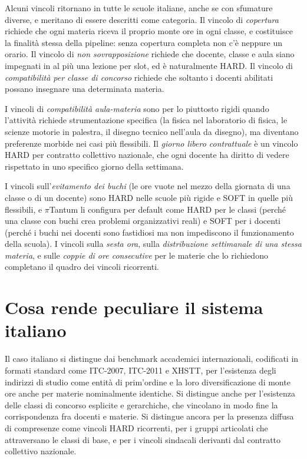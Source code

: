 Alcuni vincoli ritornano in tutte le scuole italiane, anche
se con sfumature diverse, e meritano di essere descritti
come categoria. Il vincolo di \emph{copertura} richiede che
ogni materia riceva il proprio monte ore in ogni classe, e
costituisce la finalit\`a stessa della pipeline: senza
copertura completa non c'\`e neppure un orario. Il vincolo
di \emph{non sovrapposizione} richiede che docente, classe e
aula siano impegnati in al pi\`u una lezione per slot, ed \`e
naturalmente HARD. Il vincolo di \emph{compatibilit\`a per
classe di concorso} richiede che soltanto i docenti
abilitati possano insegnare una determinata materia.

I vincoli di \emph{compatibilit\`a aula-materia} sono per lo
piuttosto rigidi quando l'attivit\`a richiede strumentazione
specifica (la fisica nel laboratorio di fisica, le scienze
motorie in palestra, il disegno tecnico nell'aula da disegno),
ma diventano preferenze morbide nei casi pi\`u flessibili. Il
\emph{giorno libero contrattuale} \`e un vincolo HARD per
contratto collettivo nazionale, che ogni docente ha diritto
di vedere rispettato in uno specifico giorno della settimana.

I vincoli sull'\emph{evitamento dei buchi} (le ore vuote
nel mezzo della giornata di una classe o di un docente) sono
HARD nelle scuole pi\`u rigide e SOFT in quelle pi\`u
flessibili, e $\pi$Tantum li configura per default come HARD
per le classi (perch\'e una classe con buchi crea problemi
organizzativi reali) e SOFT per i docenti (perch\'e i buchi
nei docenti sono fastidiosi ma non impediscono il
funzionamento della scuola). I vincoli sulla
\emph{sesta ora}, sulla \emph{distribuzione settimanale di
una stessa materia}, e sulle \emph{coppie di ore consecutive}
per le materie che lo richiedono completano il quadro dei
vincoli ricorrenti.

\section{Cosa rende peculiare il sistema italiano}

Il caso italiano si distingue dai benchmark accademici
internazionali, codificati in formati standard come
ITC-2007, ITC-2011 e XHSTT, per l'esistenza degli
indirizzi di studio come entit\`a di prim'ordine e la loro
diversificazione di monte ore anche per materie nominalmente
identiche. Si distingue anche per l'esistenza delle classi
di concorso esplicite e gerarchiche, che vincolano in modo
fine la corrispondenza fra docenti e materie. Si distingue
ancora per la presenza diffusa di compresenze come vincoli
HARD ricorrenti, per i gruppi articolati che attraversano
le classi di base, e per i vincoli sindacali derivanti dal
contratto collettivo nazionale.

